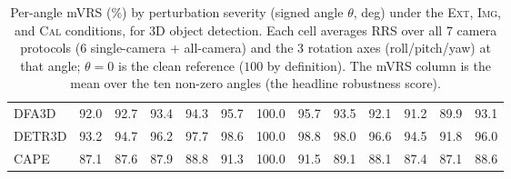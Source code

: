\begin{table}[t]
{\begin{tabular}{l ccccccccccc c}
DFA3D     & 92.0 & 92.7 & 93.4 & 94.3 & 95.7 & 100.0 & 95.7 & 93.5 & 92.1 & 91.2 & 89.9 & 93.1\\
DETR3D    & 93.2 & 94.7 & 96.2 & 97.7 & 98.6 & 100.0 & 98.8 & 98.0 & 96.6 & 94.5 & 91.8 & 96.0\\
CAPE      & 87.1 & 87.6 & 87.9 & 88.8 & 91.3 & 100.0 & 91.5 & 89.1 & 88.1 & 87.4 & 87.1 & 88.6\\
\bottomrule
\end{tabular}}
\caption{Per-angle mVRS (\%) by perturbation severity (signed angle $\theta$, deg) under the \textsc{Ext}, \textsc{Img}, and \textsc{Cal} conditions, for 3D object detection. Each cell averages RRS over all 7 camera protocols (6 single-camera + all-camera) and the 3 rotation axes (roll/pitch/yaw) at that angle; $\theta{=}0$ is the clean reference ($100$ by definition). The mVRS column is the mean over the ten non-zero angles (the headline robustness score).}
\label{tab:supp_severity_det}
\end{table}
